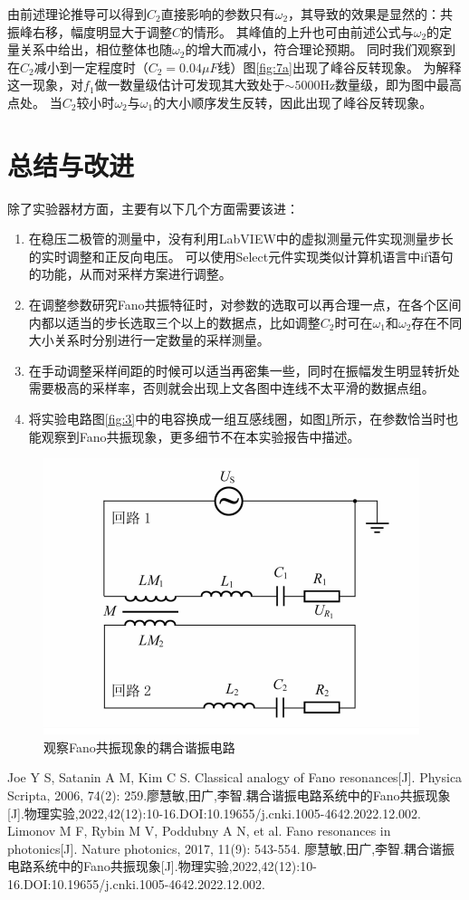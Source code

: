 \documentclass[12pt, a4paper]{ctexart}
\begin{document}
由前述理论推导可以得到$C_2$直接影响的参数只有$\omega_2$，其导致的效果是显然的：共振峰右移，幅度明显大于调整$C$的情形。
其峰值的上升也可由前述公式与$\omega_2$的定量关系中给出，相位整体也随$\omega_2$的增大而减小，符合理论预期。
同时我们观察到在$C_2$减小到一定程度时（$C_2 = 0.04\mu F$线）图\ref{fig:7a}出现了峰谷反转现象。
为解释这一现象，对$f_1$做一数量级估计可发现其大致处于$\sim 5000$Hz数量级，即为图中最高点处。
当$C_2$较小时$\omega_2$与$\omega_1$的大小顺序发生反转，因此出现了峰谷反转现象。

\section{总结与改进}

除了实验器材方面，主要有以下几个方面需要该进：
\begin{enumerate}
    \item 在稳压二极管的测量中，没有利用LabVIEW中的虚拟测量元件实现测量步长的实时调整和正反向电压。
    可以使用Select元件实现类似计算机语言中if语句的功能，从而对采样方案进行调整。
    \item 在调整参数研究Fano共振特征时，对参数的选取可以再合理一点，在各个区间内都以适当的步长选取三个以上的数据点，比如调整$C_2$时可在$\omega_1$和$\omega_2$存在不同大小关系时分别进行一定数量的采样测量。
    \item 在手动调整采样间距的时候可以适当再密集一些，同时在振幅发生明显转折处需要极高的采样率，否则就会出现上文各图中连线不太平滑的数据点组。
    \item 将实验电路图\ref{fig:3}中的电容换成一组互感线圈，如图\ref{fig:8}所示，在参数恰当时也能观察到Fano共振现象，更多细节不在本实验报告中描述。
\end{enumerate}

\begin{figure}[!t]
    \centering
    \includegraphics[width=0.5\linewidth]{./figure/互感Fano共振.png}
    \caption{观察Fano共振现象的耦合谐振电路}
    \label{fig:8}
\end{figure}

\begin{thebibliography}{1}
   Joe Y S, Satanin A M, Kim C S. Classical analogy of Fano resonances[J]. Physica Scripta, 2006, 74(2): 259.廖慧敏,田广,李智.耦合谐振电路系统中的Fano共振现象[J].物理实验,2022,42(12):10-16.DOI:10.19655/j.cnki.1005-4642.2022.12.002. 
   Limonov M F, Rybin M V, Poddubny A N, et al. Fano resonances in photonics[J]. Nature photonics, 2017, 11(9): 543-554.
   廖慧敏,田广,李智.耦合谐振电路系统中的Fano共振现象[J].物理实验,2022,42(12):10-16.DOI:10.19655/j.cnki.1005-4642.2022.12.002. 
\end{thebibliography}

\printbibliography[title={参考文献}]
\end{document}
